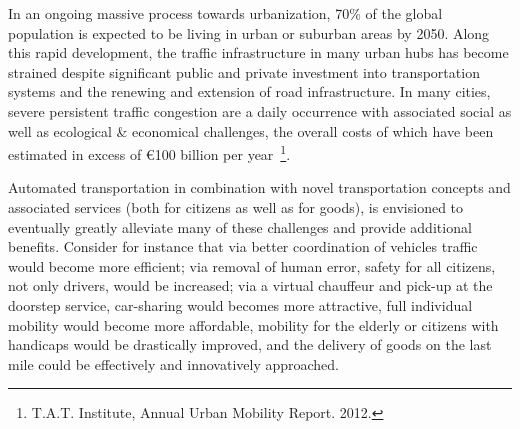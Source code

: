 

In an ongoing massive process towards urbanization, 70\% of the global population is expected to be living in urban or suburban areas by 2050. Along this rapid development, the traffic infrastructure in many urban hubs has become strained despite significant public and private investment into transportation systems and the renewing and extension of road infrastructure. In many cities, severe persistent traffic congestion are a daily occurrence with associated social as well as ecological \& economical challenges, the overall costs of which have been estimated in excess of \euro100 billion per year~\footnote{T.A.T. Institute, Annual Urban Mobility Report. 2012.}.



Automated transportation in combination with novel transportation concepts and associated services (both for citizens as well as for goods), is envisioned to eventually greatly alleviate many of these challenges and provide additional benefits.
Consider for instance that via better coordination of vehicles traffic would become more efficient; via removal of human error, safety for all citizens, not only drivers, would be increased; via a virtual chauffeur and pick-up at the doorstep service, car-sharing would becomes more attractive, full individual mobility would become more affordable, mobility for the elderly or citizens with handicaps would be drastically improved, and the delivery of goods on the last mile could be effectively and innovatively approached.

